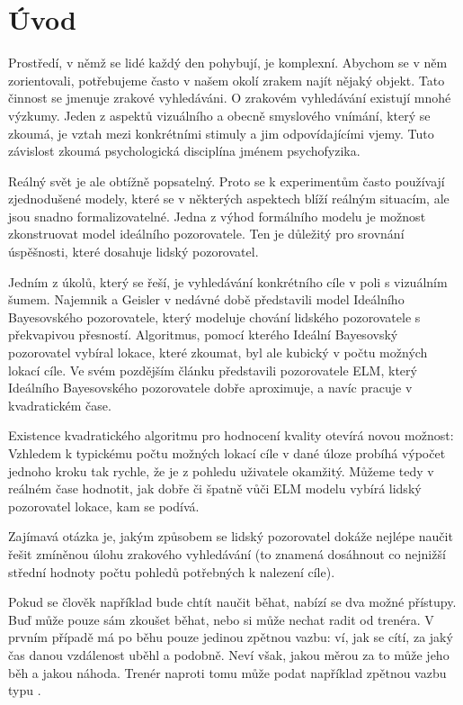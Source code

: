 \chapter*{Úvod}

Prostředí, v němž se lidé každý den pohybují, je komplexní. Abychom se v něm
zorientovali, potřebujeme často v našem okolí zrakem najít nějaký objekt. Tato
činnost se jmenuje zrakové vyhledáváni. O zrakovém vyhledávání existují mnohé
výzkumy. Jeden z aspektů vizuálního a obecně smyslového vnímání, který se
zkoumá, je vztah mezi konkrétními stimuly a jim odpovídajícími vjemy. Tuto
závislost zkoumá psychologická disciplína jménem psychofyzika.

Reálný svět je ale obtížně popsatelný. Proto se k experimentům často
používají zjednodušené modely, které se v některých aspektech blíží reálným
situacím, ale jsou snadno formalizovatelné. Jedna z výhod formálního modelu je
možnost zkonstruovat model ideálního pozorovatele. Ten je důležitý pro srovnání
úspěšnosti, které dosahuje lidský pozorovatel.

Jedním z úkolů, který se řeší, je vyhledávání konkrétního cíle v poli s vizuálním šumem.
Najemnik a Geisler \citeyearpar{Najemnik05} v nedávné době představili model
Ideálního Bayesovského pozorovatele, který modeluje chování lidského
pozorovatele s překvapivou přesností. Algoritmus, pomocí kterého Ideální
Bayesovský pozorovatel vybíral lokace, které zkoumat, byl ale kubický v počtu
možných lokací cíle. Ve svém pozdějším článku \citep{Najemnik09} 
představili pozorovatele ELM, který Ideálního Bayesovského pozorovatele dobře
aproximuje, a navíc pracuje v kvadratickém čase.

Existence kvadratického algoritmu pro hodnocení kvality otevírá novou možnost:
Vzhledem k typickému počtu možných lokací cíle v dané úloze probíhá výpočet jednoho kroku
tak rychle, že je z pohledu uživatele okamžitý. Můžeme tedy v reálném
čase hodnotit, jak dobře či špatně vůči ELM modelu vybírá lidský pozorovatel
lokace, kam se podívá.

Zajímavá otázka je, jakým způsobem se lidský pozorovatel dokáže nejlépe naučit
řešit zmíněnou úlohu zrakového vyhledávání (to znamená dosáhnout co nejnižší
střední hodnoty počtu pohledů potřebných k nalezení cíle).

Pokud se člověk například bude chtít naučit běhat, nabízí se dva možné přístupy.
Buď může pouze sám zkoušet běhat, nebo si může nechat radit od trenéra. V prvním
případě má po běhu pouze jedinou zpětnou vazbu: ví, jak se cítí, za jaký čas
danou vzdálenost uběhl a podobně. Neví však, jakou měrou za to může jeho běh a 
jakou náhoda. Trenér naproti tomu může podat například zpětnou vazbu typu .

